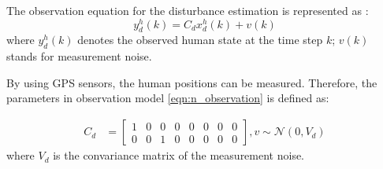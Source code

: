 \documentclass[journal]{IEEEtran}
\begin{document}
	The observation equation for the disturbance estimation is represented as : 
	\small\begin{equation}
	y_d^h(k)=C_dx_d^h(k)+v(k)\label{eqn:n_observation}
	\end{equation}\normalsize
	where $y_d^h(k)$ denotes the observed human state at the time step $k$; $v(k)$ stands for measurement noise. 
	
	By using GPS sensors, the human positions can be measured.
	Therefore, the parameters in observation model \cref{eqn:n_observation} is defined as:
	\addtocounter{equation}{-1}
	\small\begin{subequations}
		\begin{align*}
		C_d&=\left[
		\begin{array}{cccccccc}
		1& 0& 0& 0& 0& 0& 0& 0\\
		0& 0& 1& 0& 0& 0& 0& 0
		\end{array}\right],
		v\sim\mathcal{N}(0,V_d)
		\end{align*}
	\end{subequations}\normalsize
	where $V_d$ is the convariance matrix of the measurement noise.	
\end{document}

